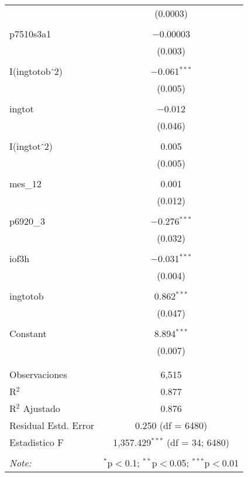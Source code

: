 \begin{table}[H]
{\begin{tabular}{@{\extracolsep{5pt}}lc}
  & (0.0003) \\ 
  & \\ 
 p7510s3a1 & $-$0.00003 \\ 
  & (0.003) \\ 
  & \\ 
 I(ingtotob$\hat{\mkern6mu}$2) & $-$0.061$^{***}$ \\ 
  & (0.005) \\ 
  & \\ 
 ingtot & $-$0.012 \\ 
  & (0.046) \\ 
  & \\ 
 I(ingtot$\hat{\mkern6mu}$2) & 0.005 \\ 
  & (0.005) \\ 
  & \\ 
 mes\_12 & 0.001 \\ 
  & (0.012) \\ 
  & \\ 
 p6920\_3 & $-$0.276$^{***}$ \\ 
  & (0.032) \\ 
  & \\ 
 iof3h & $-$0.031$^{***}$ \\ 
  & (0.004) \\ 
  & \\ 
 ingtotob & 0.862$^{***}$ \\ 
  & (0.047) \\ 
  & \\ 
 Constant & 8.894$^{***}$ \\ 
  & (0.007) \\ 
  & \\ 
\hline \\[-1.8ex] 
Observaciones & 6,515 \\ 
R$^{2}$ & 0.877 \\ 
R$^{2}$ Ajustado & 0.876 \\ 
Residual Estd. Error & 0.250 (df = 6480) \\ 
Estadistico F & 1,357.429$^{***}$ (df = 34; 6480) \\ 
\hline 
\hline \\[-1.8ex] 
\textit{Note:}  & \multicolumn{1}{r}{$^{*}$p$<$0.1; $^{**}$p$<$0.05; $^{***}$p$<$0.01} \\ 
\end{tabular} 
}
\end{table}